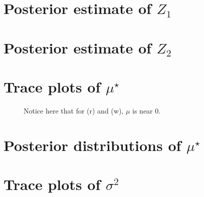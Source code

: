 \documentclass[10pt]{article} %
\begin{document}
\newpage
\section{Posterior estimate of $Z_1$}
\begin{figure}[H]
  \begin{center}  %
  \end{center}
  \label{fig:z1}
\end{figure}

\newpage
\section{Posterior estimate of $Z_2$}
\begin{figure}[H]
  \begin{center}  %
  \end{center}
  \label{fig:z2}
\end{figure}

\newpage
\section{Trace plots of $\mu^\star$}
\begin{figure}[H]
  \begin{center}  %
  \end{center}
  \label{fig:mutrace}
  \caption{Notice here that for (r) and (w), $\mu$ is near 0.}
\end{figure}

\newpage
\section{Posterior distributions of $\mu^\star$}
\begin{figure}[H]
  \begin{center}  %
  \end{center}
  \label{fig:mu}
\end{figure}

\newpage
\section{Trace plots of $\sigma^2$}
\begin{figure}[H]
  \begin{center}  %
  \end{center}
  \label{fig:sigtrace}
\end{figure}
\end{document}
